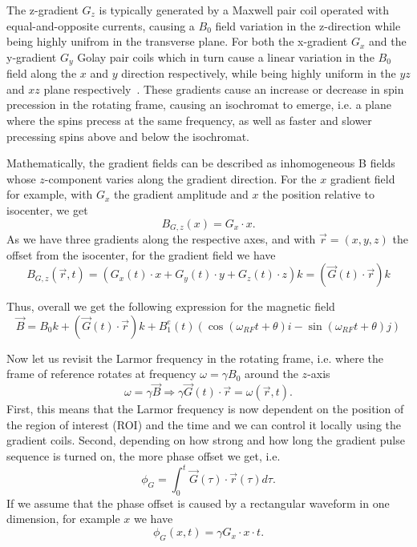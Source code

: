 The z-gradient $G_z$ is typically generated by a Maxwell pair coil operated with equal-and-opposite currents, causing a $B_0$ field variation in the z-direction while being highly unifrom in the transverse plane.
For both the x-gradient $G_x$ and the y-gradient $G_y$ Golay pair coils which in turn cause a linear variation in the $B_0$ field along the $x$ and $y$ direction respectively, while being highly uniform in the $yz$ and $xz$ plane respectively~\autocite{brown_introduction_2014}.
These gradients cause an increase or decrease in spin precession in the rotating frame, causing an isochromat to emerge, i.e. a plane where the spins precess at the same frequency, as well as faster and slower precessing spins above and below the isochromat.

Mathematically, the gradient fields can be described as inhomogeneous B fields whose $z$-component varies along the gradient direction.
For the $x$ gradient field for example, with $G_x$ the gradient amplitude and $x$ the position relative to isocenter, we get
\[ B_{G, z} (x) = G_x \cdot x. \]
As we have three gradients along the respective axes, and with $\overrightarrow{r} = (x, y, z)$ the offset from the isocenter, for the gradient field we have
\[ B_{G, z} (\overrightarrow{r}, t) = (G_x(t) \cdot x + G_y(t) \cdot y + G_z(t) \cdot z) k = ( \overrightarrow{G}(t) \cdot \overrightarrow{r}) k \]

Thus, overall we get the following expression for the magnetic field
\[ \overrightarrow{B} = B_0 k + (\overrightarrow{G}(t) \cdot \overrightarrow{r}) k + B_1^e (t) \left(\cos\left(\omega_{RF} t + \theta \right) i - \sin\left(\omega_{RF} t + \theta \right) j \right) \]

Now let us revisit the Larmor frequency in the rotating frame, i.e. where the frame of reference rotates at frequency $\omega = \gamma B_0$ around the $z$-axis
\[ \omega = \gamma \overrightarrow{B} \Rightarrow \gamma \overrightarrow{G}(t) \cdot \overrightarrow{r} = \omega(\overrightarrow{r}, t). \]
First, this means that the Larmor frequency is now dependent on the position of the region of interest (ROI) and the time and we can control it locally using the gradient coils.
Second, depending on how strong and how long the gradient pulse sequence is turned on, the more phase offset we get, i.e.
\[ \phi_G = \int_0^t \overrightarrow{G}(\tau) \cdot \overrightarrow{r}(\tau) d \tau. \]
If we assume that the phase offset is caused by a rectangular waveform in one dimension, for example $x$ we have
\[ \phi_G (x, t) = \gamma G_x \cdot x \cdot t. \]

